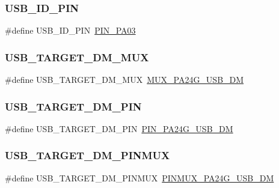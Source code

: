 \subsubsection{\texorpdfstring{USB\_ID\_PIN}{USB\_ID\_PIN}}
{\footnotesize\ttfamily \#define U\+S\+B\+\_\+\+I\+D\+\_\+\+P\+IN~\mbox{\hyperlink{pio_2samd21j18a_8h_a32b9f520e39b943f78a864645721a9d6}{P\+I\+N\+\_\+\+P\+A03}}}

\mbox{\label{group__samd21__xplained__pro__features__group_ga5b51bfdd1df608201dde0215a32c7d85}} 
\subsubsection{\texorpdfstring{USB\_TARGET\_DM\_MUX}{USB\_TARGET\_DM\_MUX}}
{\footnotesize\ttfamily \#define U\+S\+B\+\_\+\+T\+A\+R\+G\+E\+T\+\_\+\+D\+M\+\_\+\+M\+UX~\mbox{\hyperlink{pio_2samd21j18a_8h_a584d5dc42d06b5df0b9e6c7dd5714cc2}{M\+U\+X\+\_\+\+P\+A24\+G\+\_\+\+U\+S\+B\+\_\+\+DM}}}

\mbox{\label{group__samd21__xplained__pro__features__group_ga875ea014cfd19a7a60e27dd9f5fa54d9}} 
\subsubsection{\texorpdfstring{USB\_TARGET\_DM\_PIN}{USB\_TARGET\_DM\_PIN}}
{\footnotesize\ttfamily \#define U\+S\+B\+\_\+\+T\+A\+R\+G\+E\+T\+\_\+\+D\+M\+\_\+\+P\+IN~\mbox{\hyperlink{pio_2samd21j18a_8h_a402ed7e21f4453f9c95d6acd4627003c}{P\+I\+N\+\_\+\+P\+A24\+G\+\_\+\+U\+S\+B\+\_\+\+DM}}}

\mbox{\label{group__samd21__xplained__pro__features__group_ga3590903d24923c02d7c5560ce1e11939}} 
\subsubsection{\texorpdfstring{USB\_TARGET\_DM\_PINMUX}{USB\_TARGET\_DM\_PINMUX}}
{\footnotesize\ttfamily \#define U\+S\+B\+\_\+\+T\+A\+R\+G\+E\+T\+\_\+\+D\+M\+\_\+\+P\+I\+N\+M\+UX~\mbox{\hyperlink{pio_2samd21j18a_8h_afbe712ab64bb60fa94edbc8facaade2f}{P\+I\+N\+M\+U\+X\+\_\+\+P\+A24\+G\+\_\+\+U\+S\+B\+\_\+\+DM}}}

